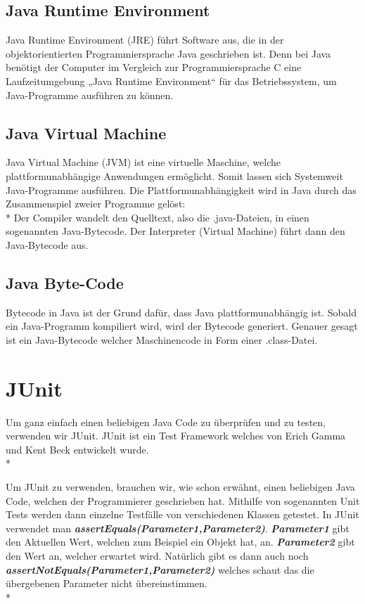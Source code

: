 \subsection{Java Runtime Environment }
\author{David Ignjatovic} 

Java Runtime Environment (JRE) führt Software aus, die in der objektorientierten Programmiersprache Java geschrieben ist. 
Denn bei Java benötigt der Computer im Vergleich zur Programmiersprache C eine Laufzeitumgebung „Java Runtime Environment“ für das Betriebssystem, um Java-Programme ausführen zu können. \cite{JRE}

\subsection{Java Virtual Machine}
\author{David Ignjatovic} 

Java Virtual Machine (JVM) ist eine virtuelle Maschine, welche plattformunabhängige Anwendungen ermöglicht. Somit lassen sich Systemweit Java-Programme ausführen.
Die Plattformunabhängigkeit wird in Java durch das Zusammenspiel zweier Programme gelöst: \\*
Der Compiler wandelt den Quelltext, also die .java-Dateien, in einen sogenannten Java-Bytecode. Der Interpreter (Virtual Machine) führt dann den Java-Bytecode aus. \cite{JVM}

\subsection{Java Byte-Code}
\author{David Ignjatovic} 

Bytecode in Java ist der Grund dafür, dass Java plattformunabhängig ist. Sobald ein Java-Programm kompiliert wird, wird der Bytecode generiert. 
Genauer gesagt ist ein Java-Bytecode welcher Maschinencode in Form einer .class-Datei.

\section{JUnit}
\author{David Ignjatovic} 

Um ganz einfach einen beliebigen Java Code zu überprüfen und zu testen, verwenden wir JUnit. JUnit ist ein Test Framework welches von Erich Gamma und Kent Beck
entwickelt wurde. \cite{JUnit} \\*

Um JUnit zu verwenden, brauchen wir, wie schon erwähnt, einen beliebigen Java Code, welchen der Programmierer geschrieben hat. 
Mithilfe von sogenannten Unit Tests werden dann einzelne Testfälle von verschiedenen Klassen getestet. In JUnit verwendet man 
\textbf{\textit{assertEquals(Parameter1,Parameter2)}}. 
\textbf{\textit{Parameter1}} gibt den Aktuellen Wert, welchen zum Beispiel ein Objekt hat, an. \textbf{\textit{Parameter2}} gibt den Wert an, welcher erwartet wird. 
Natürlich gibt es dann auch noch \textbf{\textit{assertNotEquals(Parameter1,Parameter2)}} welches schaut das die übergebenen Parameter nicht übereinstimmen. \\*

